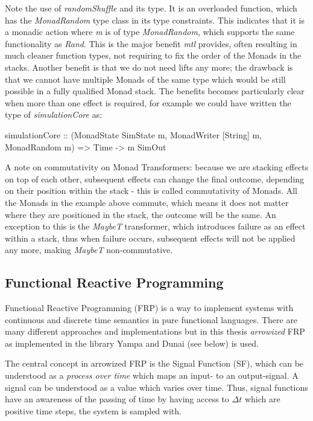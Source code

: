 Note the use of \textit{randomShuffle} and its type. It is an overloaded function, which has the \textit{MonadRandom} type class in its type constraints. This indicates that it is a monadic action where \textit{m} is of type \textit{MonadRandom}, which supports the same functionality as \textit{Rand}. This is the major benefit \textit{mtl} provides, often resulting in much cleaner function types, not requiring to fix the order of the Monads in the stacks. Another benefit is that we do not need lifts any more; the drawback is that we cannot have multiple Monads of the same type which would be still possible in a fully qualified Monad stack. The benefits becomes particularly clear when more than one effect is required, for example we could have written the type of \textit{simulationCore} as:

\begin{HaskellCode}
simulationCore :: (MonadState SimState m, MonadWriter [String] m, MonadRandom m) 
               => Time -> m SimOut
\end{HaskellCode}

A note on commutativity on Monad Transformers: because we are stacking effects on top of each other, subsequent effects can change the final outcome, depending on their position within the stack - this is called commutativity of Monads. All the Monads in the example above commute, which means it does not matter where they are positioned in the stack, the outcome will be the same. An exception to this is the \textit{MaybeT} transformer, which introduces failure as an effect within a stack, thus when failure occurs, subsequent effects will not be applied any more, making \textit{MaybeT} non-commutative. 

\subsection{Functional Reactive Programming}
\label{sec:back_frp}
Functional Reactive Programming (FRP) is a way to implement systems with continuous and discrete time semantics in pure functional languages. There are many different approaches and implementations but in this thesis \textit{arrowized} FRP \cite{hughes_generalising_2000, hughes_programming_2005} as implemented in the library Yampa \cite{courtney_yampa_2003,hudak_arrows_2003,nilsson_functional_2002} and Dunai \cite{perez_functional_2016} (see below) is used.

The central concept in arrowized FRP is the Signal Function (SF), which can be understood as a \textit{process over time} which maps an input- to an output-signal. A signal can be understood as a value which varies over time. Thus, signal functions have an awareness of the passing of time by having access to $\Delta t$ which are positive time steps, the system is sampled with. 

